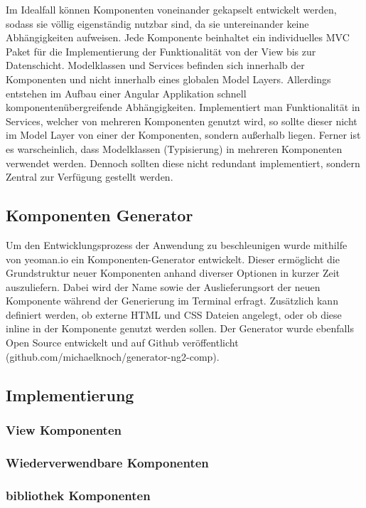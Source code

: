 Im Idealfall können Komponenten voneinander gekapselt entwickelt werden,
sodass sie völlig eigenständig nutzbar sind, da sie untereinander keine Abhängigkeiten aufweisen.
Jede Komponente beinhaltet ein individuelles \ac{MVC} Paket für die Implementierung der Funktionalität von der View bis zur Datenschicht.
Modelklassen und Services befinden sich innerhalb der Komponenten und nicht innerhalb eines globalen Model Layers.
Allerdings entstehen im Aufbau einer Angular Applikation schnell komponentenübergreifende Abhängigkeiten.
Implementiert man Funktionalität in Services, welcher von mehreren Komponenten genutzt wird,
so sollte dieser nicht im Model Layer von einer der Komponenten, sondern außerhalb liegen.
Ferner ist es warscheinlich, dass Modelklassen (Typisierung) in mehreren Komponenten verwendet werden.
Dennoch sollten diese nicht redundant implementiert,
sondern Zentral zur Verfügung gestellt werden.


\subsection{Komponenten Generator}

Um den Entwicklungsprozess der Anwendung zu beschleunigen wurde mithilfe von yeoman.io ein Komponenten-Generator entwickelt.
Dieser ermöglicht die Grundstruktur neuer Komponenten anhand diverser Optionen in kurzer Zeit auszuliefern.
Dabei wird der Name sowie der Auslieferungsort der neuen Komponente während der Generierung im Terminal erfragt.
Zusätzlich kann definiert werden, ob externe \ac{HTML} und \ac{CSS} Dateien angelegt, oder ob diese inline in der Komponente genutzt werden sollen.
Der Generator wurde ebenfalls Open Source entwickelt und auf Github veröffentlicht
(github.com/michaelknoch/generator-ng2-comp).

\subsection{Implementierung}

\subsubsection{View Komponenten}

\subsubsection{Wiederverwendbare Komponenten}

\subsubsection{bibliothek Komponenten}




